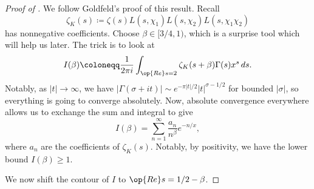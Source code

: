 \documentclass[../notes.tex]{subfiles}
\begin{document}
\begin{proof}[Proof of ]
	We follow Goldfeld's proof of this result. Recall
	\[\zeta_K(s)\coloneqq\zeta(s)L(s,\chi_1)L(s,\chi_2)L(s,\chi_1\chi_2)\]
	has nonnegative coefficients. Choose $\beta\in[3/4,1)$, which is a surprise tool which will help us later. The trick is to look at
	\[I(\beta)\coloneqq\frac1{2\pi i}\int_{\op{Re}s=2}\zeta_K(s+\beta)\Gamma(s)x^s\,ds.\]
	Notably, as $|t|\to\infty$, we have $|\Gamma(\sigma+it)|\sim e^{-\pi|t|/2}|t|^{\sigma-1/2}$ for bounded $|\sigma|$, so everything is going to converge absolutely. Now, absolute convergence everywhere allows us to exchange the sum and integral to give
	\[I(\beta)=\sum_{n=1}^\infty\frac{a_n}{n^\beta}e^{-n/x},\]
	where $a_n$ are the coefficients of $\zeta_K(s)$. Notably, by positivity, we have the lower bound $I(\beta)\ge1$.

	We now shift the contour of $I$ to $\op{Re}s=1/2-\beta$. 
\end{proof}
\end{document}

